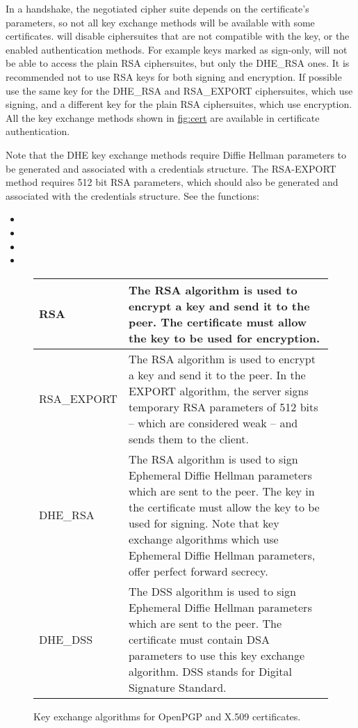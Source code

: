 \par
In a handshake, the negotiated cipher suite depends on the 
certificate's parameters, so not all key exchange methods will be available
with some certificates. \gnutls{} will disable ciphersuites that are not compatible with the key, or
the enabled authentication methods. For example keys marked as sign-only, will not be able to
access the plain RSA ciphersuites, but only the DHE\_RSA ones. It is
recommended not to use RSA keys for both signing and encryption. If possible
use the same key for the DHE\_RSA and RSA\_EXPORT ciphersuites, which use signing,
and a different key for the plain RSA ciphersuites, which use encryption.
All the key exchange methods shown in \hyperref{figure}{figure }{}{fig:cert} are
available in certificate authentication. 

Note that the DHE key exchange methods require Diffie Hellman parameters
to be generated and associated with a credentials structure. The RSA-EXPORT
method requires 512 bit RSA parameters, which should also be generated
and associated with the credentials structure. See the functions:
\begin{itemize}
\item {}
\item {}
\item {}
\item {}
\end{itemize}


\begin{figure}[hbtp]
\begin{tabular}{|l|p{9cm}|}
\hline
RSA & The RSA algorithm is used to encrypt a key and send it to the peer.
The certificate must allow the key to be used for encryption.
\\
\hline
RSA\_EXPORT & The RSA algorithm is used to encrypt a key and send it to the peer.
In the EXPORT algorithm, the server signs temporary RSA parameters of 512
bits -- which are considered weak -- and sends them to the client.
\\
\hline
DHE\_RSA & The RSA algorithm is used to sign Ephemeral Diffie Hellman
parameters which are sent to the peer. The key in the certificate must allow
the key to be used for signing. Note that key exchange algorithms which use
Ephemeral Diffie Hellman parameters, offer perfect forward secrecy.
\\
\hline
DHE\_DSS & The DSS algorithm is used to sign Ephemeral Diffie Hellman
parameters which are sent to the peer. The certificate must contain DSA
parameters to use this key exchange algorithm. DSS stands for Digital Signature
Standard.
\\
\hline
\end{tabular}

\caption{Key exchange algorithms for OpenPGP and X.509 certificates.}
\label{fig:cert}

\end{figure}


